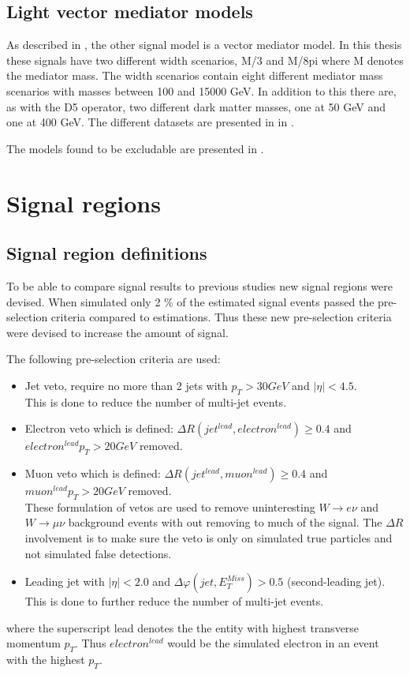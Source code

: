 \subsection{Light vector mediator models}\label{sec:signal:subsec:vecmed}
As described in , the other signal model is a vector mediator model. In this thesis these signals have two different width scenarios, M/3 and M/8pi where M denotes the mediator mass. The width scenarios contain eight different mediator mass scenarios with masses between 100 and 15000 GeV. In addition to this there are, as with the D5 operator, two different dark matter masses, one at 50 GeV and one at 400 GeV. The different datasets are presented in  in .

The models found to be excludable are presented in . 
\newpage
\section{Signal regions}
\subsection{Signal region definitions}\label{sec:sr:subsec:srd}
To be able to compare signal results to previous studies new signal regions were devised. When simulated only 2 \% of the estimated signal events passed the pre-selection criteria compared to estimations. Thus these new pre-selection criteria were devised to increase the amount of signal. 

The following pre-selection criteria are used:
\begin{itemize}
\item Jet veto, require no more than 2 jets with $p_T > 30 GeV$ and $|\eta| < 4.5$.  \\ 
This is done to reduce the number of multi-jet events.
\item Electron veto which is defined: $\Delta R (jet^{lead},electron^{lead})\geq 0.4$ and \\
$electron^{lead} p_T>20 GeV$ removed.
\item Muon veto which is defined: $\Delta R (jet^{lead},muon^{lead})\geq 0.4$ and \\
$muon^{lead} p_T>20 GeV$ removed. \\
These formulation of vetos are used to remove uninteresting $W \rightarrow e \nu$ and $W \rightarrow \mu \nu$ background events with out removing to much of the signal. The $\Delta R$ involvement is to make sure the veto is only on simulated true particles and not simulated false detections.
\item Leading jet with $|\eta| < 2.0$ and $\Delta \varphi (jet, E_T^{Miss})>0.5$ (second-leading jet).\\ 
This is done to further reduce the number of multi-jet events.
\end{itemize}
where the superscript lead denotes the the entity with highest transverse momentum $p_T$. Thus $electron^{lead}$ would be the simulated electron in an event with the highest $p_T$.

